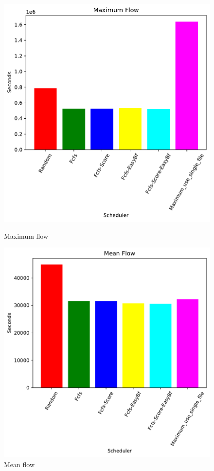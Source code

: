 \documentclass[a4paper]{article}
\begin{document}
	\begin{figure}[H]
	\begin{minipage}[b]{0.5\linewidth}\centering\includegraphics[width=1\linewidth]{MBSS/plot/2022-03-16_Maximum_flow450_128_32_256_4_1024.pdf}\caption{Maximum flow}\vspace{4ex}\end{minipage}
	\begin{minipage}[b]{0.5\linewidth}\centering\includegraphics[width=1\linewidth]{MBSS/plot/2022-03-16_Mean_flow450_128_32_256_4_1024.pdf}\caption{Mean flow}\vspace{4ex}\end{minipage} 

\end{figure}
\end{document}
